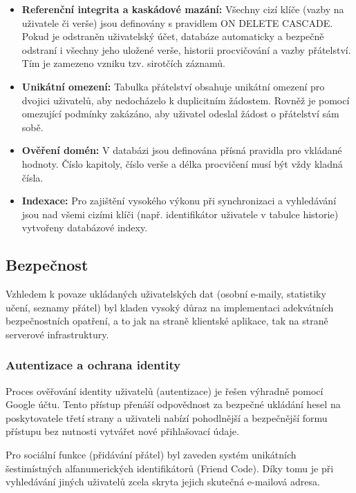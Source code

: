 \documentclass[12pt, a4paper, oneside]{article}
\begin{document}
	\begin{itemize}
		\item \textbf{Referenční integrita a kaskádové mazání: }Všechny cizí klíče (vazby na uživatele či verše) jsou definovány s pravidlem ON DELETE CASCADE. Pokud je odstraněn uživatelský účet, databáze automaticky a bezpečně odstraní i všechny jeho uložené verše, historii procvičování a vazby přátelství. Tím je zamezeno vzniku tzv. sirotčích záznamů.
		
		\item \textbf{Unikátní omezení: }Tabulka přátelství obsahuje unikátní omezení pro dvojici uživatelů, aby nedocházelo k duplicitním žádostem. Rovněž je pomocí omezující podmínky zakázáno, aby uživatel odeslal žádost o přátelství sám sobě.
		
		\item \textbf{Ověření domén: }V databázi jsou definována přísná pravidla pro vkládané hodnoty. Číslo kapitoly, číslo verše a délka procvičení musí být vždy kladná čísla.
		\item \textbf{Indexace: }Pro zajištění vysokého výkonu při synchronizaci a vyhledávání jsou nad všemi cizími klíči (např. identifikátor uživatele v tabulce historie) vytvořeny databázové indexy.
	\end{itemize}
	
	\subsection{Bezpečnost}
	Vzhledem k povaze ukládaných uživatelských dat (osobní e-maily, statistiky učení, seznamy přátel) byl kladen vysoký důraz na implementaci adekvátních bezpečnostních opatření, a to jak na straně klientské aplikace, tak na straně serverové infrastruktury.
	
	\subsubsection{Autentizace a ochrana identity}
	Proces ověřování identity uživatelů (autentizace) je řešen výhradně pomocí Google účtu. Tento přístup přenáší odpovědnost za bezpečné ukládání hesel na poskytovatele třetí strany a uživateli nabízí pohodlnější a bezpečnější formu přístupu bez nutnosti vytvářet nové přihlašovací údaje.
	
	Pro sociální funkce (přidávání přátel) byl zaveden systém unikátních šestimístných alfanumerických identifikátorů (Friend Code). Díky tomu je při vyhledávání jiných uživatelů zcela skryta jejich skutečná e-mailová adresa.
	
\end{document}
